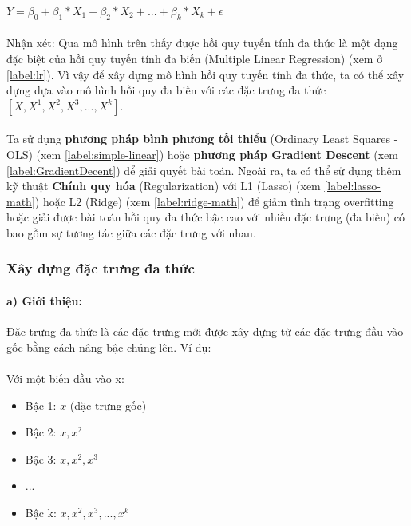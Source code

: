 \begin{center}
\large $Y = \beta_0+\beta_1*X_1+\beta_2*X_2+...+\beta_k*X_k + \epsilon$
\end{center}

\paragraph{}{Nhận xét: Qua mô hình trên thấy được hồi quy tuyến tính đa thức là một dạng đặc biệt của hồi quy tuyến tính đa biến (Multiple Linear Regression) (xem ở \ref{label:lr}). Vì vậy để xây dựng mô hình hồi quy tuyến tính đa thức, ta có thể xây dựng dựa vào mô hình hồi quy đa biến với các đặc trưng đa thức $[X, X^1, X^2,X^3,...,X^k]$.}

\paragraph{}{Ta sử dụng \textbf{phương pháp bình phương tối thiểu} (Ordinary Least Squares - OLS) (xem \ref{label:simple-linear}) hoặc \textbf{phương pháp Gradient Descent} (xem \ref{label:GradientDecent}) để giải quyết bài toán. Ngoài ra, ta có thể sử dụng thêm kỹ thuật \textbf{Chính quy hóa} (Regularization) với L1 (Lasso) (xem \ref{label:lasso-math}) hoặc L2 (Ridge) (xem \ref{label:ridge-math}) để giảm tình trạng overfitting hoặc giải được bài toán hồi quy đa thức bậc cao với nhiều đặc trưng (đa biến) có bao gồm sự tương tác giữa các đặc trưng với nhau.}

\subsubsection{Xây dựng đặc trưng đa thức}
\paragraph{a) Giới thiệu:}{Đặc trưng đa thức là các đặc trưng mới được xây dựng từ các đặc trưng đầu vào gốc bằng cách nâng bậc chúng lên. Ví dụ:}
\paragraph{}{Với một biến đầu vào x:}
\begin{itemize}
    \item Bậc 1: $x$ (đặc trưng gốc)
    \item Bậc 2: $x, x^2$
    \item Bậc 3: $x, x^2, x^3$
    \item ...
    \item Bậc k: $x, x^2, x^3, ..., x^k$
\end{itemize}

